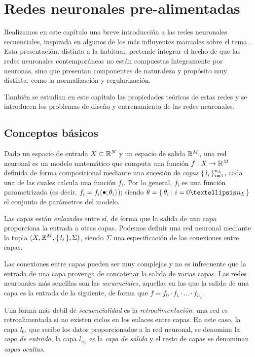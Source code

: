 \chapter{Redes neuronales pre-alimentadas}
Realizamos en este capítulo una breve introducción a las redes neuronales secuenciales, inspirada en algunos de los más influyentes manuales sobre el tema \cite{goodfellow2016deep,bishop2006pattern,zhang2021dive}. Esta presentación, distinta a la habitual, pretende integrar el hecho  de que las redes neuronales contemporáneas no están compuestas íntegramente por neuronas, sino que presentan componentes de naturaleza y propósito muy distinta, como la normalización y regularización. 

También se estudian en este capítulo las propiedades teóricas de estas redes y se introducen los problemas de diseño y entrenamiento de las redes neuronales.

\section{Conceptos básicos}
Dado un espacio de entrada \( X \subset \mathbb{R}^{N} \) y un espacio de salida \( \mathbb{R}^{M} \), una red neuronal es un modelo matemático que computa una función \( f: X \to \mathbb{R}^{M} \) definida de forma composicional mediante una sucesión de \textit{capas} \( \{\,l_{i}\,\}_{i=1}^{n_L} \), cada una de las cuales calcula una función \( f_{i} \). Por lo general, \( f_{i} \) es una función parametrizada (es decir, \( f_{i} = f_{i}(\mathord{\smallbullet}; \theta_i) \)); siendo \( \theta = \Set{\theta_i \mid i = 0 … n_L} \) el conjunto de parámetros del modelo.

Las capas están \textit{enlazadas} entre sí, de forma que la salida de una capa proporciona la entrada a otras capas. Podemos definir una red neuronal mediante la tupla \( (X, \mathbb{R}^{M}, \{\, l_i \,\}, \Sigma) \), siendo \( \Sigma \) una especificación de las conexiones entre capas.

Las conexiones entre capas pueden ser muy complejas y no es infrecuente que la entrada de una capa provenga de concatenar la salida de varias capas. Las redes neuronales más sencillas son las \textit{secuenciales}, aquellas en las que la salida de una capa es la entrada de la siguiente, de forma que \( f = f_{0} \cdot f_{1} \cdot … \cdot f_{n_L} \).

Una forma más debil de \textit{secuencialidad} es la \textit{retroalimentación}: una red es retroalimentada si no existen ciclos en los enlaces entre capas. En este caso, la capa \( l_0 \), que recibe los datos proporcionados a la red neuronal, se denomina la \textit{capa de entrada}, la capa \( l_{n_L} \) es la \textit{capa de salida} y el resto de capas se denominan \textit{capas ocultas}.

